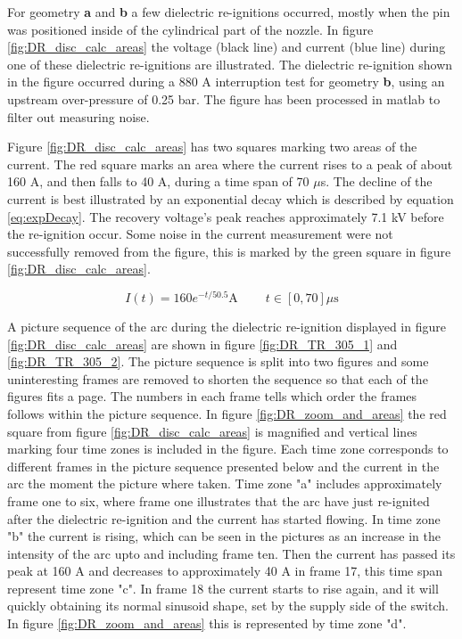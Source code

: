 \documentclass[10pt,b5paper,twoside]{article}
\begin{document}
For geometry \textbf{a} and \textbf{b} a few dielectric re-ignitions occurred, mostly when the pin was positioned inside of the cylindrical part of the nozzle. In figure \ref{fig:DR_disc_calc_areas} the voltage (black line) and current (blue line) during one of these dielectric re-ignitions are illustrated. The dielectric re-ignition shown in the figure occurred during a 880 A interruption test for geometry \textbf{b}, using an upstream over-pressure of 0.25 bar. The figure has been processed in matlab to filter out measuring noise.

Figure \ref{fig:DR_disc_calc_areas} has two squares marking two areas of the current. The red square marks an area where the current rises to a peak of about 160 A, and then falls to 40 A, during a time span of 70 $\mu$s. The decline of the current is best illustrated by an exponential decay which is described by equation \eqref{eq:expDecay}. The recovery voltage's peak reaches approximately 7.1 kV before the re-ignition occur. Some noise in the current measurement were not successfully removed from the figure, this is marked by the green square in figure \ref{fig:DR_disc_calc_areas}.

\begin{equation} \label{eq:expDecay}
I(t)=160e^{-t/50.5} \mathrm{A} \ \ \ \ \ \ \ \ \ \ t \in [0,70] \mu \mathrm{s}
\end{equation}

A picture sequence of the arc during the dielectric re-ignition displayed in figure \ref{fig:DR_disc_calc_areas} are shown in figure \ref{fig:DR_TR_305_1} and \ref{fig:DR_TR_305_2}. The picture sequence is split into two figures and some uninteresting frames are removed to shorten the sequence so that each of the figures fits a page. The numbers in each frame tells which order the frames follows within the picture sequence. In figure \ref{fig:DR_zoom_and_areas} the red square from figure \ref{fig:DR_disc_calc_areas} is magnified and vertical lines marking four time zones is included in the figure. Each time zone corresponds to different frames in the picture sequence presented below and the current in the arc the moment the picture where taken. Time zone "a" includes approximately frame one to six, where frame one illustrates that the arc have just re-ignited after the dielectric re-ignition and the current has started flowing. In time zone "b" the current is rising, which can be seen in the pictures as an increase in the intensity of the arc upto and including frame ten. Then the current has passed its peak at 160 A and decreases to approximately 40 A in frame 17, this time span represent time zone "c". In frame 18 the current starts to rise again, and it will quickly obtaining its normal sinusoid shape, set by the supply side of the switch. In figure \ref{fig:DR_zoom_and_areas} this is represented by time zone "d".
\end{document}
